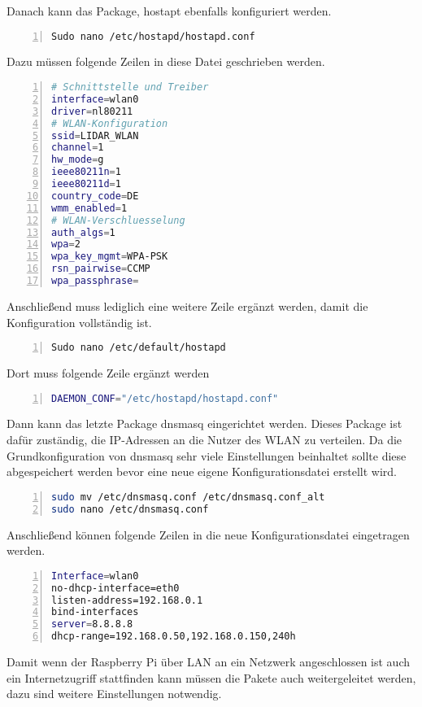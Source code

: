 Danach kann das Package, hostapt ebenfalls konfiguriert werden. 
\begin{lstlisting}[caption={Konfiguration Hostapd Schritt 1}, language={bash}, numbers=left]
Sudo nano /etc/hostapd/hostapd.conf
\end{lstlisting}
Dazu müssen folgende Zeilen in diese Datei geschrieben werden.
\begin{lstlisting}[caption={Konfiguration Hostapd Schritt 2}, language={bash}, numbers=left]
# Schnittstelle und Treiber
interface=wlan0
driver=nl80211
# WLAN-Konfiguration
ssid=LIDAR_WLAN
channel=1
hw_mode=g
ieee80211n=1
ieee80211d=1
country_code=DE
wmm_enabled=1
# WLAN-Verschluesselung
auth_algs=1
wpa=2
wpa_key_mgmt=WPA-PSK
rsn_pairwise=CCMP
wpa_passphrase=
\end{lstlisting}
Anschließend muss lediglich eine weitere Zeile ergänzt werden, damit die Konfiguration vollständig ist.
\begin{lstlisting}[caption={Konfiguration Hostapd Schritt 3}, language={bash}, numbers=left]
Sudo nano /etc/default/hostapd
\end{lstlisting}
Dort muss folgende Zeile ergänzt werden
\begin{lstlisting}[caption={Konfiguration Hostapd Schritt 4}, language={bash}, numbers=left]
DAEMON_CONF="/etc/hostapd/hostapd.conf"
\end{lstlisting}
Dann kann das letzte Package dnsmasq eingerichtet werden. Dieses Package ist dafür zuständig, die \ac{IP}-Adressen an die Nutzer des \ac{WLAN} zu verteilen.
Da die Grundkonfiguration von dnsmasq sehr viele Einstellungen beinhaltet sollte diese abgespeichert werden bevor eine neue eigene Konfigurationsdatei erstellt wird.
\begin{lstlisting}[caption={Konfiguration dnsmasq Schritt 1}, language={bash}, numbers=left]
sudo mv /etc/dnsmasq.conf /etc/dnsmasq.conf_alt
sudo nano /etc/dnsmasq.conf
\end{lstlisting}
Anschließend können folgende Zeilen in die neue Konfigurationsdatei eingetragen werden.
\begin{lstlisting}[caption={Konfiguration dnsmasq Schritt 2}, language={bash}, numbers=left]
Interface=wlan0
no-dhcp-interface=eth0
listen-address=192.168.0.1
bind-interfaces
server=8.8.8.8
dhcp-range=192.168.0.50,192.168.0.150,240h
\end{lstlisting}
Damit wenn der Raspberry Pi über \ac{LAN} an ein Netzwerk angeschlossen ist auch ein Internetzugriff stattfinden kann müssen die Pakete auch weitergeleitet werden, dazu sind weitere Einstellungen notwendig.

